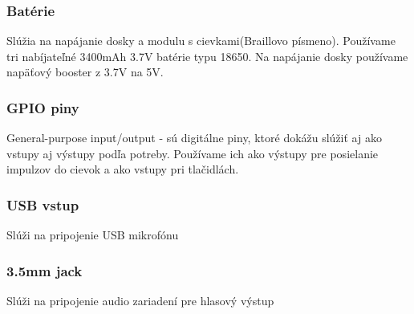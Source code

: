\documentclass{template/socthesis}
\begin{document}
\subsubsection{Batérie}
Slúžia na napájanie dosky a modulu s cievkami(Braillovo písmeno). Používame tri nabíjateľné 3400mAh 3.7V batérie typu 18650. Na napájanie dosky používame napäťový booster z 3.7V na 5V.

\subsubsection{GPIO piny}
General-purpose input/output - sú digitálne piny, ktoré dokážu slúžiť aj ako vstupy aj výstupy podľa potreby. Používame ich ako výstupy pre posielanie impulzov do cievok a ako vstupy pri tlačidlách. 

\subsubsection{USB vstup}
Slúži na pripojenie USB mikrofónu

\subsubsection{3.5mm jack}
Slúži na pripojenie audio zariadení pre hlasový výstup
\end{document}
